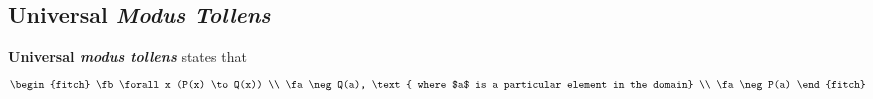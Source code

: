 \subsection{Universal \emph{Modus Tollens}}

\textbf{Universal \emph{modus tollens}} states that
\begin{equation}
  \begin{fitch}
    \fb \forall x (P(x) \to Q(x)) \\
    \fa \neg Q(a), \text{ where $a$ is a particular element in the domain} \\
    \fa \neg P(a)
  \end{fitch}
  \label{eq:univ_mod_tol}
\end{equation}


